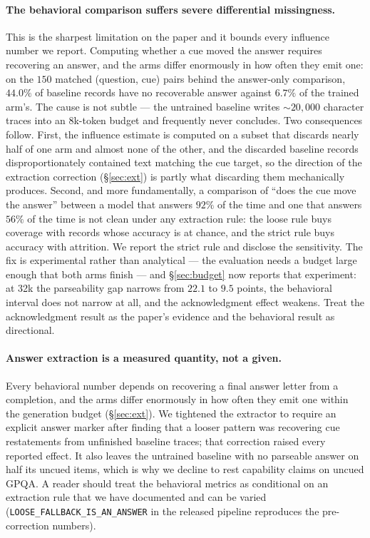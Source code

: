\documentclass{article}
\begin{document}
\paragraph{The behavioral comparison suffers severe differential missingness.}
This is the sharpest limitation on the paper and it bounds every influence
number we report. Computing whether a cue moved the answer requires recovering
an answer, and the arms differ enormously in how often they emit one: on the
$150$ matched (question, cue) pairs behind the answer-only comparison, $44.0\%$
of baseline records have no recoverable answer against $6.7\%$ of the trained
arm's. The cause is not subtle --- the untrained baseline writes ${\sim}20{,}000$
character traces into an 8k-token budget and frequently never concludes. Two
consequences follow. First, the influence estimate is computed on a subset that
discards nearly half of one arm and almost none of the other, and the discarded
baseline records disproportionately contained text matching the cue target, so
the direction of the extraction correction (\S\ref{sec:ext}) is partly what
discarding them mechanically produces. Second, and more fundamentally, a
comparison of ``does the cue move the answer'' between a model that answers
$92\%$ of the time and one that answers $56\%$ of the time is not clean under
any extraction rule: the loose rule buys coverage with records whose accuracy
is at chance, and the strict rule buys accuracy with attrition. We report the
strict rule and disclose the sensitivity. The fix is experimental rather than
analytical --- the evaluation needs a budget large enough that both arms finish
--- and \S\ref{sec:budget} now reports that experiment: at 32k the parseability
gap narrows from $22.1$ to $9.5$ points, the behavioral interval does not narrow
at all, and the acknowledgment effect weakens. Treat the acknowledgment result
as the paper's evidence and the behavioral result as directional.

\paragraph{Answer extraction is a measured quantity, not a given.} Every
behavioral number depends on recovering a final answer letter from a
completion, and the arms differ enormously in how often they emit one within
the generation budget (\S\ref{sec:ext}). We tightened the extractor to require
an explicit answer marker after finding that a looser pattern was recovering
cue restatements from unfinished baseline traces; that correction raised every
reported effect. It also leaves the untrained baseline with no parseable answer
on half its uncued items, which is why we decline to rest capability claims on
uncued GPQA. A reader should treat the behavioral metrics as conditional on an
extraction rule that we have documented and can be varied
(\texttt{LOOSE\_FALLBACK\_IS\_AN\_ANSWER} in the released pipeline reproduces
the pre-correction numbers).
\end{document}
